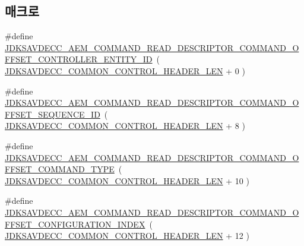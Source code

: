 \subsection*{매크로}
\begin{DoxyCompactItemize}
\item 
\#define \hyperlink{group__command__read__descriptor_gaa95bf71789e24efcbcd60f67182c38c6}{J\+D\+K\+S\+A\+V\+D\+E\+C\+C\+\_\+\+A\+E\+M\+\_\+\+C\+O\+M\+M\+A\+N\+D\+\_\+\+R\+E\+A\+D\+\_\+\+D\+E\+S\+C\+R\+I\+P\+T\+O\+R\+\_\+\+C\+O\+M\+M\+A\+N\+D\+\_\+\+O\+F\+F\+S\+E\+T\+\_\+\+C\+O\+N\+T\+R\+O\+L\+L\+E\+R\+\_\+\+E\+N\+T\+I\+T\+Y\+\_\+\+ID}~( \hyperlink{group__jdksavdecc__avtp__common__control__header_gaae84052886fb1bb42f3bc5f85b741dff}{J\+D\+K\+S\+A\+V\+D\+E\+C\+C\+\_\+\+C\+O\+M\+M\+O\+N\+\_\+\+C\+O\+N\+T\+R\+O\+L\+\_\+\+H\+E\+A\+D\+E\+R\+\_\+\+L\+EN} + 0 )
\item 
\#define \hyperlink{group__command__read__descriptor_ga5842ec46aa6c4158a7de33403f618d50}{J\+D\+K\+S\+A\+V\+D\+E\+C\+C\+\_\+\+A\+E\+M\+\_\+\+C\+O\+M\+M\+A\+N\+D\+\_\+\+R\+E\+A\+D\+\_\+\+D\+E\+S\+C\+R\+I\+P\+T\+O\+R\+\_\+\+C\+O\+M\+M\+A\+N\+D\+\_\+\+O\+F\+F\+S\+E\+T\+\_\+\+S\+E\+Q\+U\+E\+N\+C\+E\+\_\+\+ID}~( \hyperlink{group__jdksavdecc__avtp__common__control__header_gaae84052886fb1bb42f3bc5f85b741dff}{J\+D\+K\+S\+A\+V\+D\+E\+C\+C\+\_\+\+C\+O\+M\+M\+O\+N\+\_\+\+C\+O\+N\+T\+R\+O\+L\+\_\+\+H\+E\+A\+D\+E\+R\+\_\+\+L\+EN} + 8 )
\item 
\#define \hyperlink{group__command__read__descriptor_ga57934903751288bb4e412d5e4a36a0e5}{J\+D\+K\+S\+A\+V\+D\+E\+C\+C\+\_\+\+A\+E\+M\+\_\+\+C\+O\+M\+M\+A\+N\+D\+\_\+\+R\+E\+A\+D\+\_\+\+D\+E\+S\+C\+R\+I\+P\+T\+O\+R\+\_\+\+C\+O\+M\+M\+A\+N\+D\+\_\+\+O\+F\+F\+S\+E\+T\+\_\+\+C\+O\+M\+M\+A\+N\+D\+\_\+\+T\+Y\+PE}~( \hyperlink{group__jdksavdecc__avtp__common__control__header_gaae84052886fb1bb42f3bc5f85b741dff}{J\+D\+K\+S\+A\+V\+D\+E\+C\+C\+\_\+\+C\+O\+M\+M\+O\+N\+\_\+\+C\+O\+N\+T\+R\+O\+L\+\_\+\+H\+E\+A\+D\+E\+R\+\_\+\+L\+EN} + 10 )
\item 
\#define \hyperlink{group__command__read__descriptor_gac864906c26819b58db5421fe0b41a7d7}{J\+D\+K\+S\+A\+V\+D\+E\+C\+C\+\_\+\+A\+E\+M\+\_\+\+C\+O\+M\+M\+A\+N\+D\+\_\+\+R\+E\+A\+D\+\_\+\+D\+E\+S\+C\+R\+I\+P\+T\+O\+R\+\_\+\+C\+O\+M\+M\+A\+N\+D\+\_\+\+O\+F\+F\+S\+E\+T\+\_\+\+C\+O\+N\+F\+I\+G\+U\+R\+A\+T\+I\+O\+N\+\_\+\+I\+N\+D\+EX}~( \hyperlink{group__jdksavdecc__avtp__common__control__header_gaae84052886fb1bb42f3bc5f85b741dff}{J\+D\+K\+S\+A\+V\+D\+E\+C\+C\+\_\+\+C\+O\+M\+M\+O\+N\+\_\+\+C\+O\+N\+T\+R\+O\+L\+\_\+\+H\+E\+A\+D\+E\+R\+\_\+\+L\+EN} + 12 )

\end{DoxyCompactItemize}
